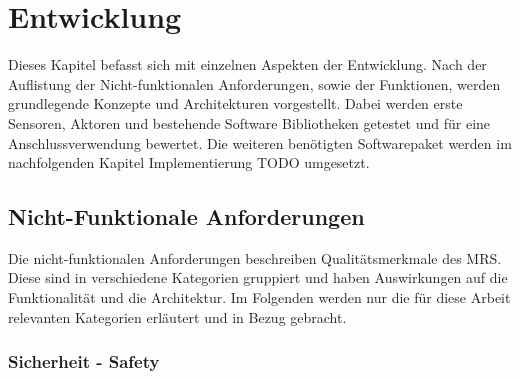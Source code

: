 \section{Entwicklung}
\label{sec:entwicklung}
Dieses Kapitel befasst sich mit einzelnen Aspekten der Entwicklung. Nach der Auflistung der Nicht-funktionalen Anforderungen, sowie der Funktionen, werden grundlegende Konzepte und Architekturen vorgestellt. Dabei werden erste Sensoren, Aktoren und bestehende Software Bibliotheken getestet und für eine Anschlussverwendung bewertet. Die weiteren benötigten Softwarepaket werden im nachfolgenden Kapitel Implementierung TODO umgesetzt.

\subsection{Nicht-Funktionale Anforderungen}
\label{sec:dev-nichtfunk}

Die nicht-funktionalen Anforderungen beschreiben Qualitätsmerkmale des MRS. Diese sind in verschiedene Kategorien gruppiert und haben Auswirkungen auf die Funktionalität und die Architektur. Im Folgenden werden nur die für diese Arbeit relevanten Kategorien erläutert und in Bezug gebracht.

\subsubsection{Sicherheit - Safety}

